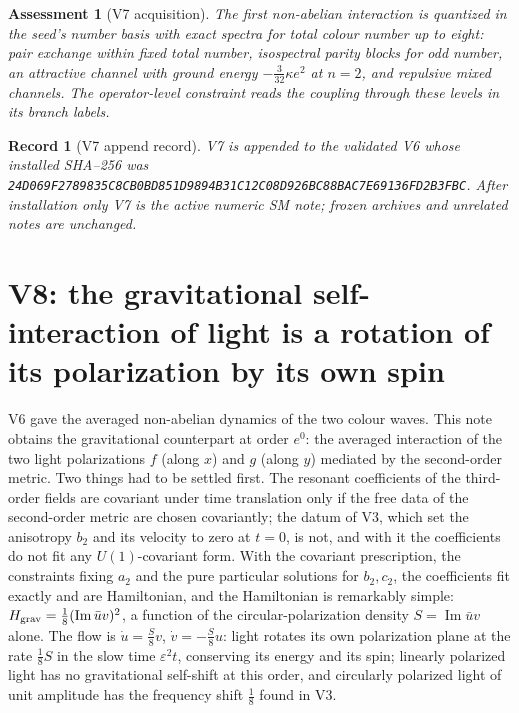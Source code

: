 \documentclass[11pt]{article}
\newtheorem{assessment}[theorem]{Assessment}
\newtheorem{record}[theorem]{Record}
\theoremstyle{remark}
\begin{document}
\begin{assessment}[V7 acquisition]
\label{ass:v20v7}
The first non-abelian interaction is quantized in the seed's number
basis with exact spectra for total colour number up to eight: pair
exchange within fixed total number, isospectral parity blocks for odd
number, an attractive channel with ground energy
\(-\tfrac3{32}\kappa e^2\) at \(n=2\), and repulsive mixed channels.
The operator-level constraint reads the coupling through these
levels in its branch labels.
\end{assessment}

\begin{record}[V7 append record]
\label{rec:v20v7}
V7 is appended to the validated V6 whose installed SHA--256 was
\texttt{24D069F2789835C8CB0BD851D9894B31C12C08D926BC88BAC7E69136FD2B3FBC}.
After installation only V7 is the active numeric SM note; frozen
archives and unrelated notes are unchanged.
\end{record}


\section{V8: the gravitational self-interaction of light is a rotation of its polarization by its own spin}
\label{sec:v20v8}

V6 gave the averaged non-abelian dynamics of the two colour waves.
This note obtains the gravitational counterpart at order \(e^0\): the
averaged interaction of the two light polarizations \(f\) (along \(x\))
and \(g\) (along \(y\)) mediated by the second-order metric.  Two
things had to be settled first.  The resonant coefficients of the
third-order fields are covariant under time translation only if the
free data of the second-order metric are chosen covariantly; the
datum of V3, which set the anisotropy \(b_2\) and its velocity to
zero at \(t=0\), is not, and with it the coefficients do not fit any
\(U(1)\)-covariant form.  With the covariant prescription, the
constraints fixing \(a_2\) and the pure particular solutions for
\(b_2,c_2\), the coefficients fit exactly and are Hamiltonian, and the
Hamiltonian is remarkably simple:
\(H_{\rm grav}=\tfrac18(\operatorname{Im}\bar uv)^2\), a function of the
circular-polarization density \(S=\operatorname{Im}\bar uv\) alone.  The
flow is \(\dot u=\tfrac S8v\), \(\dot v=-\tfrac S8u\): light rotates its
own polarization plane at the rate \(\tfrac18S\) in the slow time
\(\varepsilon^2t\), conserving its energy and its spin; linearly
polarized light has no gravitational self-shift at this order, and
circularly polarized light of unit amplitude has the frequency shift
\(\tfrac18\) found in V3.
\end{document}
